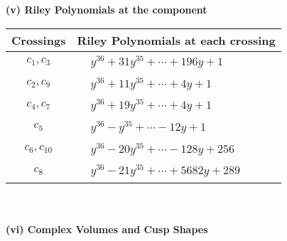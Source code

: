 \documentclass[1p]{elsarticle_modified}
\theoremstyle{definition}
\begin{document}
\newpage\renewcommand{\arraystretch}{1}
\flushleft \textbf{(v) Riley Polynomials at the component}\newline \\
\begin{tabular}{m{50pt}|m{274pt}}
Crossings & \hspace{64pt}Riley Polynomials at each crossing \\
\hline $$\begin{aligned}c_{1},c_{3}\end{aligned}$$&$\begin{aligned}
&y^{36}+31 y^{35}+\cdots+196 y+1
\end{aligned}$\\
\hline $$\begin{aligned}c_{2},c_{9}\end{aligned}$$&$\begin{aligned}
&y^{36}+11 y^{35}+\cdots+4 y+1
\end{aligned}$\\
\hline $$\begin{aligned}c_{4},c_{7}\end{aligned}$$&$\begin{aligned}
&y^{36}+19 y^{35}+\cdots+4 y+1
\end{aligned}$\\
\hline $$\begin{aligned}c_{5}\end{aligned}$$&$\begin{aligned}
&y^{36}- y^{35}+\cdots-12 y+1
\end{aligned}$\\
\hline $$\begin{aligned}c_{6},c_{10}\end{aligned}$$&$\begin{aligned}
&y^{36}-20 y^{35}+\cdots-128 y+256
\end{aligned}$\\
\hline $$\begin{aligned}c_{8}\end{aligned}$$&$\begin{aligned}
&y^{36}-21 y^{35}+\cdots+5682 y+289
\end{aligned}$\\
\hline
\end{tabular}\\~\\
\newpage\flushleft \textbf{(vi) Complex Volumes and Cusp Shapes}
\end{document}
